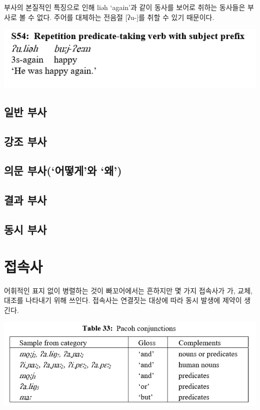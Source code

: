 부사의 본질적인 특징으로 인해 liəh `again'과 같이 동사를 보어로 취하는 동사들은 부사로 볼 수 없다. 주어를 대체하는 전음절 [ʔu-]를 취할 수 있기 때문이다.

\includegraphics{Pacoh/src/PacohS54.png}

\subsection{일반 부사}
\omission

\subsection{강조 부사}
\omission

\subsection{의문 부사(`어떻게'와 `왜')}
\omission

\subsection{결과 부사}
\omission

\subsection{동시 부사}
\omission

\section{접속사}
어휘적인 표지 없이 병렬하는 것이 빠꼬어에서는 흔하지만 몇 가지 접속사가 가, 교체, 대조를 나타내기 위해 쓰인다. 접속사는 연결짓는 대상에 따라 동시 발생에 제약이 생긴다.

\includegraphics{Pacoh/src/PacohTable33.png}

